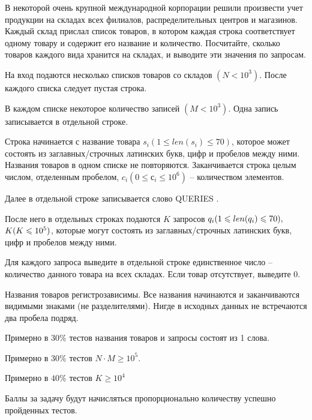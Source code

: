 
В некоторой очень крупной международной корпорации решили произвести учет продукции на складах всех филиалов, распределительных центров и магазинов. Каждый склад прислал список товаров, в котором каждая строка соответствует одному товару и содержит его название и количество. Посчитайте, сколько товаров каждого вида хранится на складах, и выводите эти значения по запросам.


На вход подаются несколько списков товаров со складов $(N < 10^3)$. После каждого списка следует пустая строка.

В каждом списке некоторое количество записей $(M < 10^3)$. Одна запись записывается в отдельной строке.

Строка начинается с название товара $ s_i (1 \leq len(s_i) \leq 70) $, которое может состоять из заглавных/строчных латинских букв, цифр и пробелов между ними. Названия товаров в одном списке не повторяются. Заканчивается строка целым числом, отделенным пробелом, $ c_i (0 \leq с_i \leq 10^6) $ -- количеством элементов. 

Далее в отдельной строке записывается слово QUERIES .

После него в отдельных строках подаются $ K $ запросов $  q_i\space (1 \leq len(q_i) \leq 70),$ \linebreak $K\space (K \leq 10^5 )$, которые могут состоять из заглавных/строчных латинских букв, цифр и пробелов между ними. 

\outputfmtSection

Для каждого запроса выведите в отдельной строке единственное число -- количество данного товара на всех складах. Если товар отсутствует, выведите $ 0 $.

\explanationSection

Названия товаров регистрозависимы. Все названия начинаются и заканчиваются видимыми знаками (не разделителями). Нигде в исходных данных не встречаются два пробела подряд.

\markSection

Примерно в $ 30\% $ тестов названия товаров и запросы состоят из 1 слова. 

Примерно в $ 30\% $ тестов $  N \cdot M \geq 10 ^ 5 $.

Примерно в $ 40\% $ тестов $ K \geq 10^4 $

Баллы за задачу будут начисляться пропорционально количеству успешно пройденных тестов.

